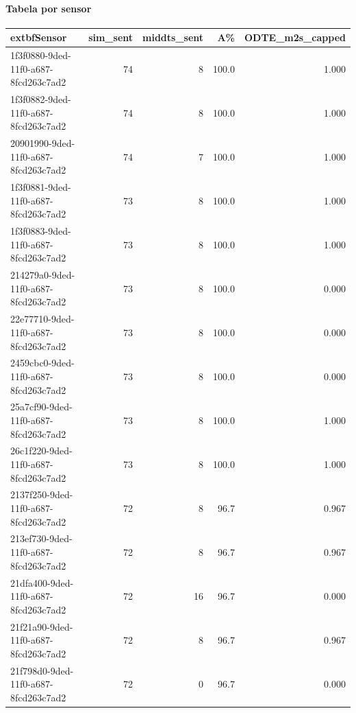 \paragraph{Tabela por sensor}

\begin{longtable}{l r r r r}
	extbf{Sensor} & \textbf{sim_sent} & \textbf{middts_sent} & \textbf{A\%} & \textbf{ODTE\_m2s\_capped} \\
\hline

1f3f0880-9ded-11f0-a687-8fcd263c7ad2 & 74 & 8 & 100.0 & 1.000 \\

1f3f0882-9ded-11f0-a687-8fcd263c7ad2 & 74 & 8 & 100.0 & 1.000 \\

20901990-9ded-11f0-a687-8fcd263c7ad2 & 74 & 7 & 100.0 & 1.000 \\

1f3f0881-9ded-11f0-a687-8fcd263c7ad2 & 73 & 8 & 100.0 & 1.000 \\

1f3f0883-9ded-11f0-a687-8fcd263c7ad2 & 73 & 8 & 100.0 & 1.000 \\

214279a0-9ded-11f0-a687-8fcd263c7ad2 & 73 & 8 & 100.0 & 0.000 \\

22e77710-9ded-11f0-a687-8fcd263c7ad2 & 73 & 8 & 100.0 & 0.000 \\

2459cbc0-9ded-11f0-a687-8fcd263c7ad2 & 73 & 8 & 100.0 & 0.000 \\

25a7cf90-9ded-11f0-a687-8fcd263c7ad2 & 73 & 8 & 100.0 & 1.000 \\

26c1f220-9ded-11f0-a687-8fcd263c7ad2 & 73 & 8 & 100.0 & 1.000 \\

2137f250-9ded-11f0-a687-8fcd263c7ad2 & 72 & 8 & 96.7 & 0.967 \\

213ef730-9ded-11f0-a687-8fcd263c7ad2 & 72 & 8 & 96.7 & 0.967 \\

21dfa400-9ded-11f0-a687-8fcd263c7ad2 & 72 & 16 & 96.7 & 0.000 \\

21f21a90-9ded-11f0-a687-8fcd263c7ad2 & 72 & 8 & 96.7 & 0.967 \\

21f798d0-9ded-11f0-a687-8fcd263c7ad2 & 72 & 0 & 96.7 & 0.000 \\


\end{longtable}

